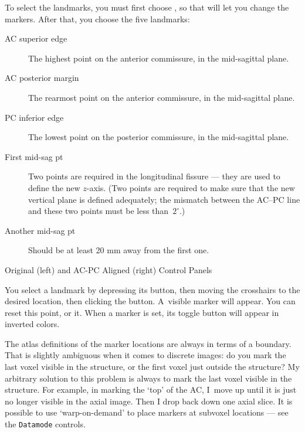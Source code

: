 To select the landmarks, you must first choose , so
that \afnit will let you change the markers.  After that, you
choose the five landmarks:
\begin{description}
  \item[\blob AC superior edge]  The highest point on the anterior commissure,
                           in the mid-sagittal plane.
  \item[\blob AC posterior margin] The rearmost point on the anterior commissure,
                           in the mid-sagittal plane.
  \item[\blob PC inferior edge] The lowest point on the posterior commissure,
                           in the mid-sagittal plane.
  \item[\blob First mid-sag pt] Two points are required in the longitudinal
      fissure --- they are used to define the new $z$-axis.  (Two points
      are required to make sure that the new vertical plane is defined
      adequately; the mismatch between the AC--PC line and these two
      points must be less than~$2^\circ$.)
  \item[\blob Another mid-sag pt] Should be at least 20 mm away from the first one.
\end{description}
\goodbreak\begin{samepage}
\centerline{\epsfxsize=6.4in}\vspace{1ex}
\centerline{\sf Original (left) and AC-PC Aligned (right)  Control Panels}
\end{samepage}\goodbreak
You select a landmark by depressing its button, then moving the crosshairs
to the desired location, then clicking the  button.  A~visible
marker will appear.  You can reset this point, or  it.  When a
marker is set, its toggle button will appear in inverted colors.

The atlas definitions of the marker locations are always in terms of
a boundary.  That is slightly ambiguous when it comes to discrete
images:  do you mark the last voxel visible in the structure, or the first
voxel just outside the structure?
My arbitrary solution to this problem is always
to mark the last voxel visible in the structure.  For example, in
marking the `top' of the AC, I~move up until it is just no longer visible
in the axial image.  Then I drop back down one axial slice.
It is possible to use
`warp-on-demand'
to place markers at subvoxel locations --- see the {\tt Datamode} controls.

